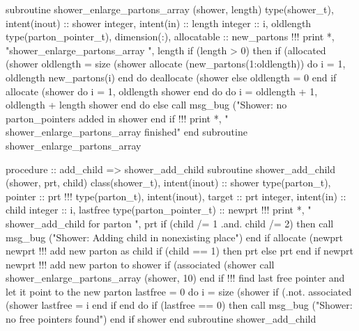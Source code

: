 \eatline
\nwendcode{}\nwdocspar
\nwenddocs{}\plusendmoddef
  subroutine shower_enlarge_partons_array (shower, length)
    type(shower_t), intent(inout) :: shower
    integer, intent(in) :: length
    integer :: i, oldlength
    type(parton_pointer_t), dimension(:), allocatable :: new_partons
    !!! print *, "shower_enlarge_partons_array ", length
    if (length > 0) then
       if (allocated (shower%
          oldlength = size (shower%
          allocate (new_partons(1:oldlength))
          do i = 1, oldlength
             new_partons(i)%
          end do
          deallocate (shower%
       else
          oldlength = 0
       end if
       allocate (shower%
       do i = 1, oldlength
          shower%
       end do
       do i = oldlength + 1, oldlength + length
          shower%
       end do
    else
       call msg_bug ("Shower: no parton_pointers added in shower%
    end if
    !!! print *, "  shower_enlarge_partons_array finished"
  end subroutine shower_enlarge_partons_array

\eatline
\nwendcode{}\nwdocspar
\nwenddocs{}\plusendmoddef
  procedure :: add_child => shower_add_child
\nwendcode{}\plusendmoddef
  subroutine shower_add_child (shower, prt, child)
    class(shower_t), intent(inout) :: shower
    type(parton_t), pointer :: prt
    !!! type(parton_t), intent(inout), target :: prt
    integer, intent(in) :: child
    integer :: i, lastfree
    type(parton_pointer_t) :: newprt
    !!! print *, " shower_add_child for parton ", prt%
    if (child /= 1 .and. child /= 2) then
       call msg_bug ("Shower: Adding child in nonexisting place")
    end if
    allocate (newprt%
    newprt%
    !!! add new parton as child
    if (child == 1) then
       prt%
    else
       prt%
    end if
    newprt%
    newprt%
    !!! add new parton to shower%
    if (associated (shower%
       call shower_enlarge_partons_array (shower, 10)
    end if
    !!! find last free pointer and let it point to the new parton
    lastfree = 0
    do i = size (shower%
       if (.not. associated (shower%
          lastfree = i
       end if
    end do
    if (lastfree == 0) then
       call msg_bug ("Shower: no free pointers found")
    end if
    shower%
  end subroutine shower_add_child

